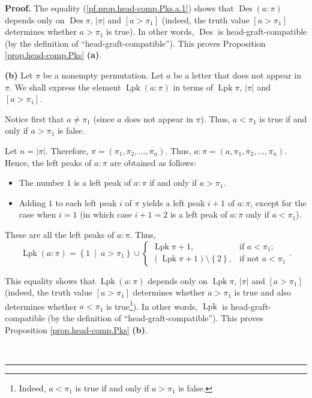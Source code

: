 \documentclass[numbers=enddot,12pt,final,onecolumn,notitlepage]{scrartcl}%
\theoremstyle{definition}
\newenvironment{proof}[1][Proof]{\noindent\textbf{#1.} }{\ \rule{0.5em}{0.5em}}
\begin{document}
\begin{proof}
The equality (\ref{pf.prop.head-comp.Pks.a.1}) shows that $\operatorname{Des}
\left(  a:\pi\right)  $ depends only on $\operatorname{Des}\pi$, $\left\vert
\pi\right\vert $ and $\left[  a>\pi_{1}\right]  $ (indeed, the truth value
$\left[  a>\pi_{1}\right]  $ determines whether $a>\pi_{1}$ is true). In other
words, $\operatorname{Des}$ is head-graft-compatible (by the definition of
\textquotedblleft head-graft-compatible\textquotedblright). This proves
Proposition \ref{prop.head-comp.Pks} \textbf{(a)}.

\textbf{(b)} Let $\pi$ be a nonempty permutation. Let $a$ be a letter that
does not appear in $\pi$. We shall express
the element $\operatorname*{Lpk}\left(  a:\pi\right)  $ in terms of
$\operatorname*{Lpk}\pi$, $\left|\pi\right|$
and $\left[  a>\pi_{1}\right]  $.

Notice first that $a\neq\pi_{1}$ (since $a$ does not appear in $\pi$). Thus,
$a<\pi_{1}$ is true if and only if $a>\pi_{1}$ is false.

Let $n=\left\vert \pi\right\vert $. Therefore, $\pi=\left(  \pi_{1},\pi
_{2},\ldots,\pi_{n}\right)  $. Thus, $a:\pi=\left(  a,\pi_{1},\pi_{2}%
,\ldots,\pi_{n}\right)  $. Hence, the left peaks of $a:\pi$ are obtained as follows:

\begin{itemize}
\item The number $1$ is a left peak of $a:\pi$ if and only if $a>\pi_{1}$.

\item Adding $1$ to each left peak $i$ of $\pi$ yields a left peak $i+1$ of
$a:\pi$, except for the case when $i=1$ (in which case $i+1=2$ is a left peak
of $a:\pi$ only if $a<\pi_{1}$).
\end{itemize}

These are all the left peaks of $a:\pi$. Thus,%
\begin{equation}
\operatorname*{Lpk}\left(  a:\pi\right)  =\left\{  1\ \mid\ a>\pi_{1}\right\}
\cup%
\begin{cases}
\operatorname*{Lpk}\pi+1, & \text{if }a<\pi_{1};\\
\left(  \operatorname*{Lpk}\pi+1\right)  \setminus\left\{  2\right\}  , &
\text{if not }a<\pi_{1}%
\end{cases}
. \label{pf.prop.head-comp.Pks.b.1}%
\end{equation}


This equality shows that $\operatorname*{Lpk}\left(  a:\pi\right)  $ depends
only on $\operatorname*{Lpk}\pi$, $\left\vert \pi\right\vert $ and $\left[
a>\pi_{1}\right]  $ (indeed, the truth value $\left[  a>\pi_{1}\right]  $
determines whether $a>\pi_{1}$ is true and also determines whether $a<\pi_{1}$
is true\footnote{Indeed, $a<\pi_{1}$ is true if and only if $a>\pi_{1}$ is
false.}). In other words, $\operatorname*{Lpk}$ is head-graft-compatible (by
the definition of \textquotedblleft head-graft-compatible\textquotedblright).
This proves Proposition \ref{prop.head-comp.Pks} \textbf{(b)}.


\end{proof}
\end{document}
